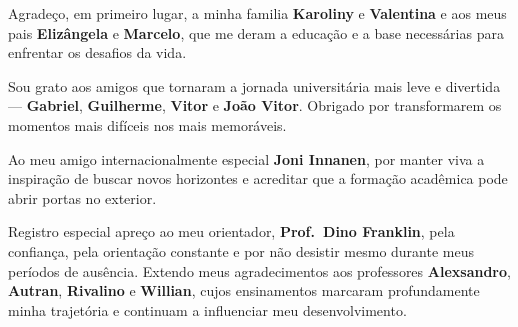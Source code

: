\documentclass[12pt, %
openright, 
oneside, %
a4paper,    %
brazil]{facom-ufu-abntex2}
\begin{document}
\begin{agradecimentos}
    Agradeço, em primeiro lugar, a minha familia \textbf{Karoliny} e \textbf{Valentina} e aos meus pais \textbf{Elizângela} e \textbf{Marcelo}, que me deram a educação e a base necessárias para enfrentar os desafios da vida.

    Sou grato aos amigos que tornaram a jornada universitária mais leve e divertida — \textbf{Gabriel}, \textbf{Guilherme}, \textbf{Vitor} e \textbf{João Vitor}. Obrigado por transformarem os momentos mais difíceis nos mais memoráveis.
    
    Ao meu amigo internacionalmente especial \textbf{Joni Innanen}, por manter viva a inspiração de buscar novos horizontes e acreditar que a formação acadêmica pode abrir portas no exterior.
    
    Registro especial apreço ao meu orientador, \textbf{Prof.\ Dino Franklin}, pela confiança, pela orientação constante e por não desistir mesmo durante meus períodos de ausência. Extendo meus agradecimentos aos professores \textbf{Alexsandro}, \textbf{Autran}, \textbf{Rivalino} e \textbf{Willian}, cujos ensinamentos marcaram profundamente minha trajetória e continuam a influenciar meu desenvolvimento.
\end{agradecimentos}


\end{document}
